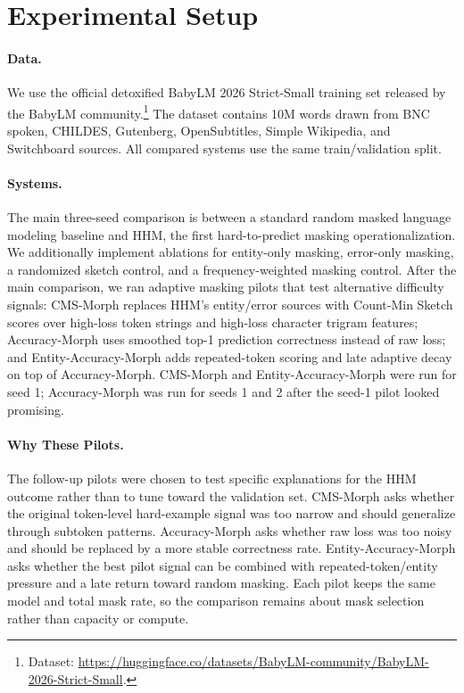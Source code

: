 \section{Experimental Setup}

\paragraph{Data.}
We use the official detoxified BabyLM 2026 Strict-Small training set released by the BabyLM community.\footnote{Dataset: \url{https://huggingface.co/datasets/BabyLM-community/BabyLM-2026-Strict-Small}.} The dataset contains 10M words drawn from BNC spoken, CHILDES, Gutenberg, OpenSubtitles, Simple Wikipedia, and Switchboard sources. All compared systems use the same train/validation split.

\paragraph{Systems.}
The main three-seed comparison is between a standard random masked language modeling baseline and HHM, the first hard-to-predict masking operationalization. We additionally implement ablations for entity-only masking, error-only masking, a randomized sketch control, and a frequency-weighted masking control. After the main comparison, we ran adaptive masking pilots that test alternative difficulty signals: CMS-Morph replaces HHM's entity/error sources with Count-Min Sketch scores over high-loss token strings and high-loss character trigram features; Accuracy-Morph uses smoothed top-1 prediction correctness instead of raw loss; and Entity-Accuracy-Morph adds repeated-token scoring and late adaptive decay on top of Accuracy-Morph. CMS-Morph and Entity-Accuracy-Morph were run for seed 1; Accuracy-Morph was run for seeds 1 and 2 after the seed-1 pilot looked promising.

\paragraph{Why These Pilots.}
The follow-up pilots were chosen to test specific explanations for the HHM outcome rather than to tune toward the validation set. CMS-Morph asks whether the original token-level hard-example signal was too narrow and should generalize through subtoken patterns. Accuracy-Morph asks whether raw loss was too noisy and should be replaced by a more stable correctness rate. Entity-Accuracy-Morph asks whether the best pilot signal can be combined with repeated-token/entity pressure and a late return toward random masking. Each pilot keeps the same model and total mask rate, so the comparison remains about mask selection rather than capacity or compute.

